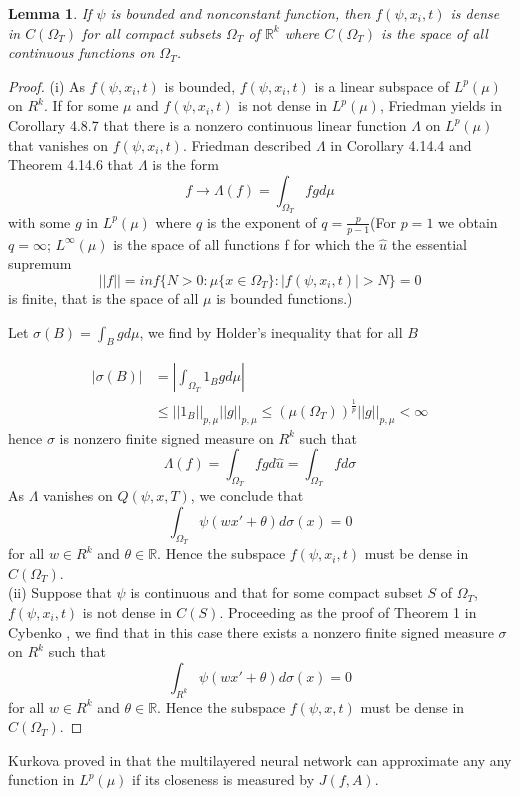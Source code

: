 \documentclass{article}
\newtheorem{lemma}{Lemma}[section]
\begin{document}
\begin{lemma}
	If $\psi$ is bounded and nonconstant function, then $f(\psi,x_i,t)$ is dense in $C(\Omega_{T})$ for all compact subsets $\Omega_{T}$ of $\mathbb{R}^{k}$ where $C(\Omega_{T})$ is the space of all continuous functions on $\Omega_{T}$. \label{dense_set}
\end{lemma}
\begin{proof}
	(i) As $f(\psi,x_i,t)$ is bounded, $f(\psi,x_i,t)$ is a linear subspace of $L^{p}(\mu)$ on $R^{k}$. If for some $\mu$ and $f(\psi,x_i,t)$ is not dense in $L^{p}(\mu)$, Friedman yields in Corollary 4.8.7 \cite{friedman} that there is a nonzero continuous linear function $\Lambda$ on $L^{p}(\mu)$ that vanishes on $f(\psi,x_i,t)$. Friedman described $\Lambda$ in Corollary 4.14.4 and Theorem 4.14.6 \cite{friedman} that $\Lambda$ is the form
	\[f \rightarrow \Lambda(f)=\int_{\Omega_{T}}fg d\mu\]
	with some $g$ in $L^{p}(\mu)$ where $q$ is the exponent of $q=\frac{p}{p-1}$(For $p=1$ we obtain $q = \infty$; $L^{\infty}(\mu)$ is the space of all functions f for which the $\hat{u}$ the essential supremum
		\[||f|| = inf\{N>0 : \mu \{x \in \Omega_{T}\} : |f(\psi,x_i,t)| > N\} = 0 \]
		is finite, that is the space of all $\mu$ is bounded functions.)

		Let $\sigma(B) = \int_{B} g d\mu$, we find by Holder's inequality that for all $B$

		\begin{equation}
		\begin{aligned}
		\left|\sigma(B)\right| &= \left|\int_{\Omega_{T}}1_{B}g d \mu\right|\\
		 & \leq ||1_{B}||_{p,\mu} ||g||_{p,\mu} \leq (\mu(\Omega_{T}))^{\frac{1}{p}}||g||_{p,\mu} < \infty
		 \end{aligned}
		\end{equation}
	     hence $\sigma$ is nonzero finite signed measure on $R^{k}$ such that
	     \begin{equation}
	     \Lambda(f) =\int_{\Omega_{T}}fg d\hat{u} =  \int_{\Omega_{T}}f d\sigma
	     \end{equation}
	     As $\Lambda$ vanishes on $Q(\psi,x,T)$, we conclude that
	     \begin{equation}
	     \int_{\Omega_{T}} \psi(wx'+\theta)d \sigma(x) = 0
	    \end{equation}
	    for all $w \in R^{k}$ and $\theta \in \mathbb{R}$. Hence the subspace $f(\psi,x_i,t)$ must be dense in $C(\Omega_{T})$.\\

	    (ii) Suppose that $\psi$ is continuous and that for some compact subset $S$ of $\Omega_{T}$, $f(\psi,x_i,t)$ is not dense in $C(S)$. Proceeding as the proof of Theorem 1 in Cybenko \cite{cybenko}, we find that in this case there exists a nonzero finite signed measure $\sigma$ on $R^{k}$ such that
	    \[ \int_{R^{k}} \psi(wx'+\theta)d \sigma(x) = 0\]
	    for all $w \in R^{k}$ and $\theta \in \mathbb{R}$. Hence the subspace $f(\psi, x, t)$ must be dense in $C(\Omega_{T})$.
\end{proof}
Kurkova proved in \cite{kurkova} that the multilayered neural network can approximate any any function in $L^{p}(\mu)$ if its closeness is measured by $J(f,A)$.
\end{document}
